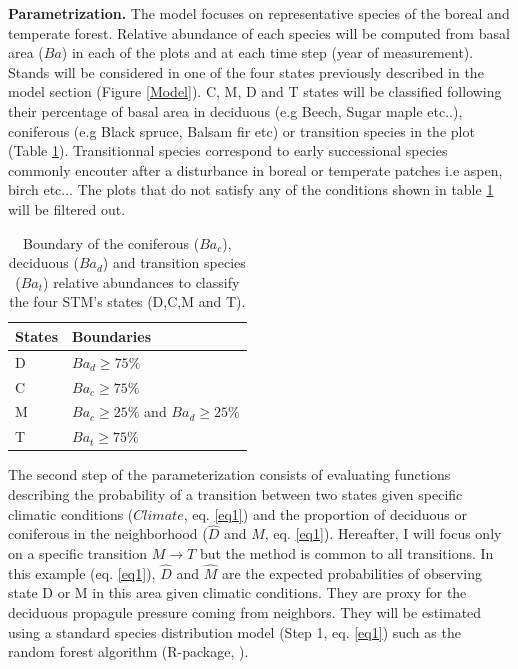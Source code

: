 \textbf{Parametrization.} The model focuses on representative species of the
boreal and temperate forest. Relative  abundance of each species will be
computed from basal area ($Ba$) in each of the plots and at each time step (year of
measurement). Stands will be considered in one of the four states previously
described in the model section (Figure \ref{Model}). C, M, D and T states will
be classified following their percentage of basal area in deciduous
(e.g Beech, Sugar maple etc..), coniferous (e.g Black spruce,
Balsam fir etc) or transition species in the plot (Table
\ref{bound}). Transitionnal species correspond to early successional species
commonly encouter after a disturbance in boreal or temperate patches i.e
aspen, birch etc... The plots that do not satisfy any of the conditions shown
in table \ref{bound} will be filtered out.\\

\begin{table}[h]
\vspace{-1em}
\centering
\caption{Boundary of the coniferous ($Ba_c$), deciduous ($Ba_d$) and transition species ($Ba_t$) relative abundances to classify the four STM's states (D,C,M and T).}
\vspace{-1em}
\small
\begin{tabular}{|l|l|}
	\hline
	\textbf{States}  & \textbf{Boundaries}                            \\
	\hline
	D & $Ba_d \geq 75\%$    \\
	C & $Ba_c \geq 75\%$   \\
	M & $Ba_c \geq 25\%$ and $Ba_d \geq 25\%$ \\
	T & $Ba_t  \geq 75\%$ \\
	\hline
\end{tabular}

\label{bound}
\end{table}

The second step of the parameterization consists of evaluating functions
describing the probability of a transition between two states given specific
climatic conditions ($Climate$, eq. \ref{eq1}) and the proportion of deciduous
or coniferous in the neighborhood ($\hat{D}$ and $\hat{M}$, eq. \ref{eq1}).
Hereafter, I will focus only on a specific transition $M \rightarrow T$ but the
method is common to  all transitions. In this example (eq. \ref{eq1}),
$\hat{D}$ and $\hat{M}$ are the expected probabilities of observing state D or
M in this area given climatic conditions. They are proxy for the deciduous
propagule pressure coming from neighbors. They will be estimated using  a
standard species distribution model (Step 1, eq. \ref{eq1}) such as the random
forest algorithm (R-package, \cite{Liaw2002a}).


